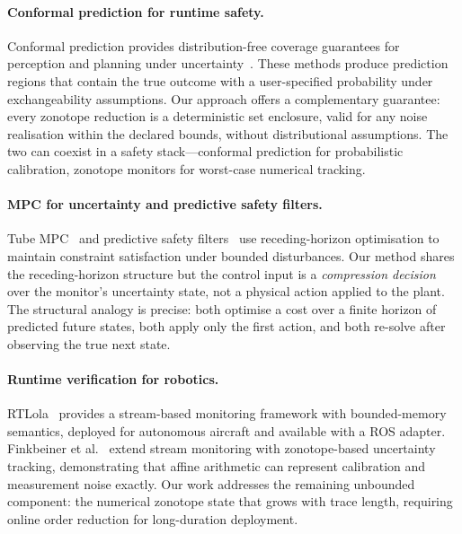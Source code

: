 \documentclass{article}
\begin{document}
\paragraph{Conformal prediction for runtime safety.}
Conformal prediction provides distribution-free coverage guarantees for perception and planning under uncertainty~\cite{Lindemann2023}.
These methods produce prediction regions that contain the true outcome with a user-specified probability under exchangeability assumptions.
Our approach offers a complementary guarantee: every zonotope reduction is a deterministic set enclosure, valid for any noise realisation within the declared bounds, without distributional assumptions.
The two can coexist in a safety stack---conformal prediction for probabilistic calibration, zonotope monitors for worst-case numerical tracking.

\paragraph{MPC for uncertainty and predictive safety filters.}
Tube MPC~\cite{Mayne2005} and predictive safety filters~\cite{WabersichZeilinger2021, Hewing2020} use receding-horizon optimisation to maintain constraint satisfaction under bounded disturbances.
Our method shares the receding-horizon structure but the control input is a \emph{compression decision} over the monitor's uncertainty state, not a physical action applied to the plant.
The structural analogy is precise: both optimise a cost over a finite horizon of predicted future states, both apply only the first action, and both re-solve after observing the true next state.

\paragraph{Runtime verification for robotics.}
RTLola~\cite{RTLola2026} provides a stream-based monitoring framework with bounded-memory semantics, deployed for autonomous aircraft and available with a ROS adapter.
Finkbeiner et al.~\cite{Finkbeiner2025} extend stream monitoring with zonotope-based uncertainty tracking, demonstrating that affine arithmetic can represent calibration and measurement noise exactly.
Our work addresses the remaining unbounded component: the numerical zonotope state that grows with trace length, requiring online order reduction for long-duration deployment.
\end{document}
